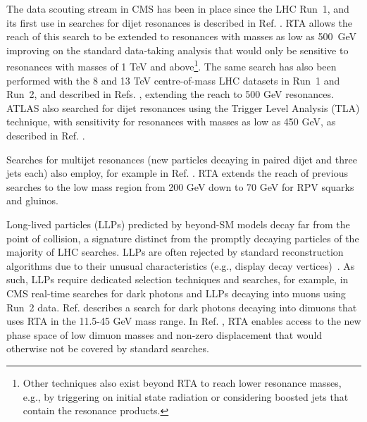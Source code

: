 \fi



The data scouting stream in CMS has been in place since the LHC Run~1, and its first use in searches for dijet resonances is described in Ref. \cite{CMS-PAS-EXO-11-094}. RTA allows the reach of this search to be extended to resonances with masses as low as \SI{500}{\giga\electronvolt}
improving on the standard data-taking analysis that would only be sensitive to resonances with masses of 1 TeV and above\footnote{Other techniques also exist beyond RTA to reach lower resonance masses, e.g., by triggering on initial state radiation or considering boosted jets that contain the resonance products.}. The same search has also been performed with the 8 and 13 TeV centre-of-mass LHC datasets in Run~1 and Run~2, and described in Refs. \cite{CMS:2016ltu, CMS:2016gsl}, extending the reach to 500 GeV resonances. ATLAS also searched for dijet resonances using the Trigger Level Analysis (TLA) technique, with sensitivity for resonances with masses as low as 450 GeV, as described in Ref. \cite{ATLAS:2018qto}.


Searches for multijet resonances (new particles decaying in paired dijet and three jets each) also employ, for example in Ref. \cite{CMS-PAS-EXO-21-004}. RTA extends the reach of previous searches to the low mass region from 200 GeV down to 70 GeV for RPV squarks and gluinos. 

Long-lived particles (LLPs) predicted by beyond-SM models decay far from the point of collision, a signature distinct from the promptly decaying particles of the majority of LHC searches. LLPs are often rejected by standard reconstruction algorithms due to their unusual characteristics (e.g., display decay vertices)~\cite{llps}. As such, LLPs require dedicated selection techniques and searches, for example, in CMS real-time searches for dark photons and LLPs decaying into muons using Run~2 data.  Ref. \cite{CMS:2019buh} describes a search for dark photons decaying into dimuons that uses RTA in the 11.5-45 GeV mass range. In Ref. \cite{CMS:2021sch}, RTA enables access to the new phase space of low dimuon masses and non-zero displacement that would otherwise not be covered by standard searches.

